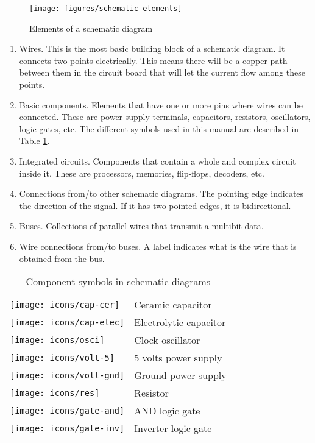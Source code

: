 \begin{figure}[h]
	\centering
	\texttt{[image: figures/schematic-elements]}
	\caption{Elements of a schematic diagram}
	\label{fig:schematic-elements}
\end{figure}

\begin{enumerate}
	\item Wires. This is the most basic building block of a schematic diagram. It connects two points electrically. This means there will be a copper path between them in the circuit board that will let the current flow among these points.
	\item Basic components. Elements that have one or more pins where wires can be connected. These are power supply terminals, capacitors, resistors, oscillators, logic gates, etc. The different symbols used in this manual are described in Table \ref{table:schematic-symbols}.
	\item Integrated circuits. Components that contain a whole and complex circuit inside it. These are processors, memories, flip-flops, decoders, etc.
	\item Connections from/to other schematic diagrams. The pointing edge indicates the direction of the signal. If it has two pointed edges, it is bidirectional.
	\item Buses. Collections of parallel wires that transmit a multibit data.
	\item Wire connections from/to buses. A label indicates what is the wire that is obtained from the bus.
\end{enumerate}

\begin{table}[h!]
	\centering
	\begin{tabular}{ m{22mm}|l }
		\centering\texttt{[image: icons/cap-cer]}  & Ceramic capacitor      \\
		\centering\texttt{[image: icons/cap-elec]} & Electrolytic capacitor \\
		\centering\texttt{[image: icons/osci]}     & Clock oscillator       \\
		\centering\texttt{[image: icons/volt-5]}   & 5 volts power supply   \\
		\centering\texttt{[image: icons/volt-gnd]} & Ground power supply    \\
		\centering\texttt{[image: icons/res]}      & Resistor               \\
		\centering\texttt{[image: icons/gate-and]} & AND logic gate         \\
		\centering\texttt{[image: icons/gate-inv]} & Inverter logic gate    \\
	\end{tabular}
	\caption{Component symbols in schematic diagrams}
	\label{table:schematic-symbols}
\end{table}

